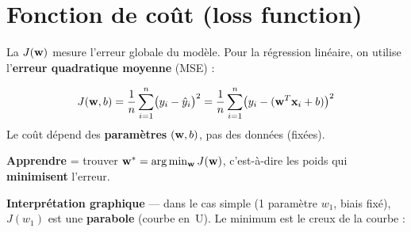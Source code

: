 %






\setlength{\parskip}{2pt}
\setlength{\abovedisplayskip}{5pt}
\setlength{\belowdisplayskip}{5pt}

\section{Fonction de co\^{u}t (loss function)}

La  $J(\mathbf{w})$ mesure l'erreur globale du mod\`{e}le.
Pour la r\'{e}gression lin\'{e}aire, on utilise l'\textbf{erreur quadratique moyenne} (MSE) :

\begin{definitionbox}
    \begin{equation}
        J(\mathbf{w}, b) = \frac{1}{n} \sum_{i=1}^{n} \bigl(y_i - \hat{y}_i\bigr)^2
        = \frac{1}{n} \sum_{i=1}^{n} \bigl(y_i - (\mathbf{w}^T \mathbf{x}_i + b)\bigr)^2
        \label{eq:cout}
    \end{equation}
    Le co\^{u}t d\'{e}pend des \textbf{param\`{e}tres} $(\mathbf{w}, b)$, pas des donn\'{e}es (fix\'{e}es).
\end{definitionbox}

\begin{retenirbox}[Objectif]
    \textbf{Apprendre} = trouver $\mathbf{w}^* = \arg\min_{\mathbf{w}} J(\mathbf{w})$,
    c'est-\`{a}-dire les poids qui \textbf{minimisent} l'erreur.
\end{retenirbox}

\textbf{Interpr\'{e}tation graphique} --- dans le cas simple (1 param\`{e}tre $w_1$, biais fix\'{e}),
$J(w_1)$ est une \textbf{parabole} (courbe en~U). Le minimum est le creux de la courbe :

